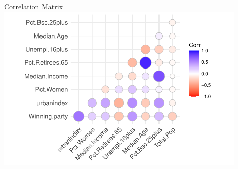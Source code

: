 \documentclass{beamer}
\begin{document}
\begin{frame}{Correlation Matrix}
    \includegraphics[width=0.9\textwidth]{plots/corrplot.pdf}
\end{frame}
\end{document}
